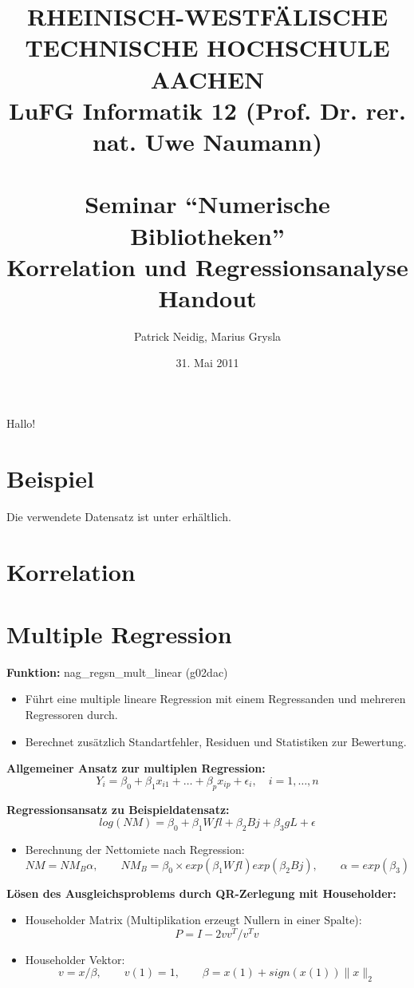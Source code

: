 \documentclass[a4paper]{article}
\title{
{\bf \scriptsize RHEINISCH-WESTF\"ALISCHE TECHNISCHE HOCHSCHULE AACHEN \\
LuFG Informatik 12 (Prof. Dr. rer. nat. Uwe Naumann)}\\
~\\
Seminar ``Numerische Bibliotheken''\\
{\bf \Large Korrelation und Regressionsanalyse} \\
{\large Handout} 
}
\author{Patrick Neidig, Marius Grysla}
\date{31. Mai 2011}
\begin{document}
\maketitle

Hallo!\cite{Cramer2007}\cite{Golub1989}

\section*{Beispiel}
Die verwendete Datensatz ist unter \cite{Fahrmeier2011} erhältlich.

\section*{Korrelation}

\section*{Multiple Regression}

{\bf Funktion:} nag\_regsn\_mult\_linear (g02dac)\cite{nag:intro}
\begin{itemize}
\item Führt eine multiple lineare Regression mit einem Regressanden und mehreren Regressoren durch.
\item Berechnet zusätzlich Standartfehler, Residuen und Statistiken zur Bewertung.
\end{itemize}

{\bf Allgemeiner Ansatz zur multiplen Regression:}
\begin{equation*}
  Y_i = \beta_0 + \beta_1 x_{i1} + \dots + \beta_p x_{ip} + \epsilon_i, \quad i = 1, \dots, n
\end{equation*}

{\bf Regressionsansatz zu Beispieldatensatz:}
\begin{equation*}
  log(NM) = \beta_0 + \beta_1 Wfl + \beta_2 Bj + \beta_3 gL + \epsilon
\end{equation*}
\begin{itemize}
\item Berechnung der Nettomiete nach Regression:
  \begin{equation*}
    NM = NM_B \alpha,\qquad
    NM_B = \beta_0 \times exp(\beta_1 Wfl) exp(\beta_2 Bj),\qquad
    \alpha = exp(\beta_3)
  \end{equation*}
\end{itemize}


{\bf Lösen des Ausgleichsproblems durch QR-Zerlegung mit Householder:}
\begin{itemize}
\item Householder Matrix (Multiplikation erzeugt Nullern in einer Spalte):
  \begin{equation*}
    P = I - 2vv^T / v^Tv
  \end{equation*}
\item Householder Vektor:
  \begin{equation*}
    v = x / \beta,\qquad v(1) = 1, \qquad \beta = x(1) + sign(x(1)) \|x\|_2
  \end{equation*}
\end{itemize}



\end{document}
